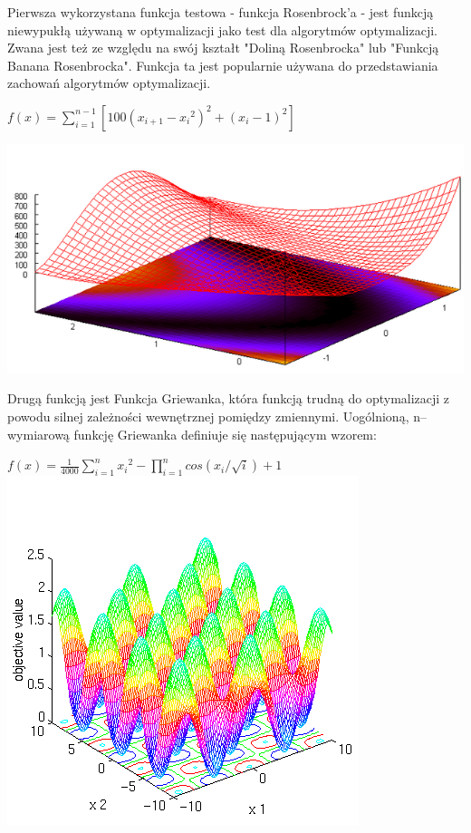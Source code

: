 \documentclass[11pt]{article}
\begin{document}
Pierwsza wykorzystana funkcja testowa - funkcja Rosenbrock'a - 
jest funkcją niewypukłą używaną w optymalizacji jako test 
dla algorytmów optymalizacji. Zwana jest też ze względu 
na swój kształt "Doliną Rosenbrocka" lub "Funkcją Banana 
Rosenbrocka". Funkcja ta jest popularnie używana do 
przedstawiania zachowań algorytmów optymalizacji.

\begin{center}
$f(x) = \sum_{i=1}^{n-1} [ 100 ( {x_{i+1} - {x_i}^2} )^2 + (x_i -1)^2]$

\includegraphics[scale=0.50]{wykres_rosenbrock}\newpage
\end{center}

Drugą funkcją jest Funkcja Griewanka, która funkcją trudną do optymalizacji
z powodu silnej zależności wewnętrznej pomiędzy zmiennymi.
Uogólnioną, n–wymiarową funkcję Griewanka definiuje się następującym wzorem:

\begin{center}
$f(x) = \frac{1}{4000} \sum_{i=1}^n {x_i}^{2} - \prod_{i=1}^n cos(x_i / \sqrt{i}) +1$
\includegraphics[scale=0.50]{wykres_griewank}\newline
\end{center}
\end{document}
